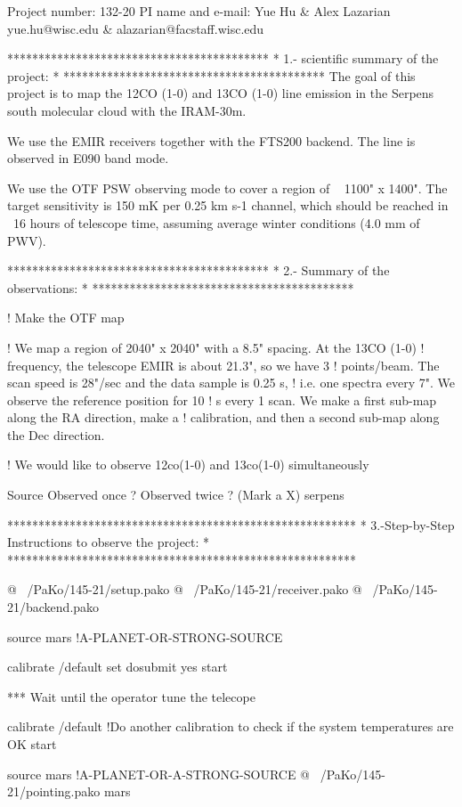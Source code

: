 Project number: 132-20
PI name and e-mail: Yue Hu \& Alex Lazarian
                    yue.hu@wisc.edu \& alazarian@facstaff.wisc.edu 

******************************************
* 1.- scientific summary of the project: *
******************************************
The goal of this project is to map the 12CO (1-0) and 13CO (1-0) line emission in the Serpens south molecular cloud with the IRAM-30m. 

We use the EMIR receivers together with the FTS200 backend. The line is observed in E090 band mode.

We use the OTF PSW observing mode to cover a region of ~ 1100" x 1400". The target sensitivity is 150 mK per 0.25 km s-1 channel, which should be reached in ~16 hours of telescope time, assuming average winter conditions (4.0 mm of PWV).

******************************************
*    2.- Summary of the observations:    *
******************************************

! Make the OTF map

! We map a region of 2040" x 2040" with a 8.5" spacing. At the 13CO (1-0)
! frequency, the telescope EMIR is about 21.3", so we have 3
! points/beam.  The scan speed is 28"/sec and the data sample is 0.25 s,
! i.e. one spectra every 7". We observe the reference position for 10
! s every 1 scan. We make a first sub-map along the RA direction, make a
! calibration, and then a second sub-map along the Dec direction. 

! We would like to observe 12co(1-0) and 13co(1-0) simultaneously

Source      Observed once ?   Observed twice ? (Mark a X)
serpens									


********************************************************
* 3.-Step-by-Step Instructions to observe the project: *
********************************************************

@ ~/PaKo/145-21/setup.pako 
@ ~/PaKo/145-21/receiver.pako
@ ~/PaKo/145-21/backend.pako

source mars        !A-PLANET-OR-STRONG-SOURCE


calibrate /default
set dosubmit yes 
start


*** Wait until the operator tune the telecope



calibrate /default   !Do another calibration to check if the system temperatures are OK 
start


source mars       !A-PLANET-OR-A-STRONG-SOURCE
@ ~/PaKo/145-21/pointing.pako mars
      
